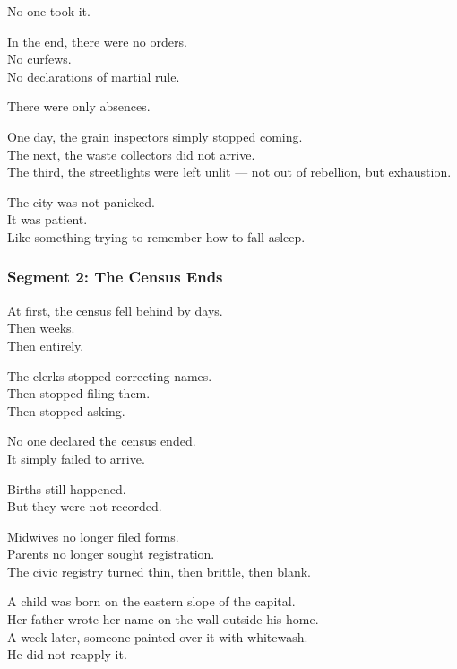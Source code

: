 \documentclass[9pt]{article}
\begin{document}
No one took it.

\vspace{1em}

In the end, there were no orders.\\
No curfews.\\
No declarations of martial rule.

There were only absences.

One day, the grain inspectors simply stopped coming.\\
The next, the waste collectors did not arrive.\\
The third, the streetlights were left unlit — not out of rebellion, but exhaustion.

The city was not panicked.\\
It was patient.\\
Like something trying to remember how to fall asleep.

\newpage

\subsubsection*{Segment 2: The Census Ends}

At first, the census fell behind by days.\\
Then weeks.\\
Then entirely.

The clerks stopped correcting names.\\
Then stopped filing them.\\
Then stopped asking.

No one declared the census ended.\\
It simply failed to arrive.

\vspace{1em}

Births still happened.\\
But they were not recorded.

Midwives no longer filed forms.\\
Parents no longer sought registration.\\
The civic registry turned thin, then brittle, then blank.

A child was born on the eastern slope of the capital.\\
Her father wrote her name on the wall outside his home.\\
A week later, someone painted over it with whitewash.\\
He did not reapply it.
\end{document}
